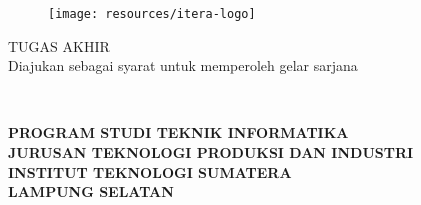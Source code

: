 \clearpage
\pagestyle{empty}
% 

\begin{center}
\smallskip

    \begin{figure}[h]
    	\centering
    	\texttt{[image: resources/itera-logo]}
    \end{figure}

	\large \bfseries \MakeUppercase{\thetitle}
	\vfill

    \large \uppercase{Tugas Akhir}\\
    {\normalsize \normalfont Diajukan sebagai syarat untuk memperoleh gelar sarjana}
    \vfill

    \normalsize \normalfont \theauthor\\
    \printnim
    \vfill

    \normalsize \bfseries
    \uppercase{
        Program Studi Teknik Informatika \\
        Jurusan Teknologi Produksi dan Industri\\
        Institut Teknologi Sumatera\\
        Lampung Selatan
    }\medskip

    \the\year{}

\end{center}

\clearpage
